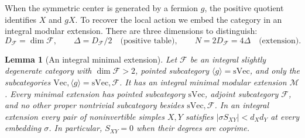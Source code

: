 \documentclass[11pt,a4paper]{article}
\numberwithin{equation}{section}
\newtheorem{lemma}[theorem]{Lemma}
\begin{document}
When the symmetric center is generated by a fermion $g$, the positive
quotient identifies $X$ and $gX$. To recover the local action we embed
the category in an integral modular extension. There are three
dimensions to distinguish:
\[
 D_{\mathcal F}=\dim\mathcal F,\qquad
 \Delta=D_{\mathcal F}/2\quad\text{(positive table)},\qquad
 N=2D_{\mathcal F}=4\Delta\quad\text{(extension)}.
\]

\begin{lemma}[An integral minimal extension]\label{loc:extension}
Let $\mathcal F$ be an integral slightly degenerate category with
$\dim\mathcal F>2$, pointed subcategory
$\langle g\rangle=\mathrm{sVec}$, and only the subcategories
$\mathrm{Vec},\langle g\rangle=\mathrm{sVec},\mathcal F$.
It has an integral minimal modular extension $\mathcal M$.
Every minimal extension has pointed subcategory $\mathrm{sVec}$,
adjoint subcategory $\mathcal F$, and no other proper nontrivial
subcategory besides $\mathrm{sVec},\mathcal F$.
In an integral extension every pair of noninvertible simples $X,Y$
satisfies $|\sigma S_{XY}|<d_Xd_Y$ at every embedding $\sigma$.
In particular, $S_{XY}=0$ when their degrees are coprime.
\end{lemma}
\end{document}

